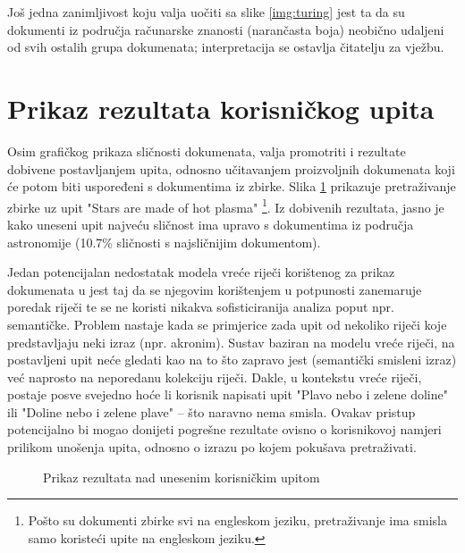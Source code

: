 \documentclass[times, utf8, zavrsni, numeric]{fer}
\begin{document}
Još jedna zanimljivost koju valja uočiti sa slike \ref{img:turing} jest ta da su dokumenti iz područja računarske znanosti (narančasta boja) neobično udaljeni od svih ostalih grupa dokumenata; interpretacija se ostavlja čitatelju za vježbu.

\section{Prikaz rezultata korisničkog upita}

Osim grafičkog prikaza sličnosti dokumenata, valja promotriti i rezultate dobivene postavljanjem upita, odnosno učitavanjem proizvoljnih dokumenata koji će potom biti uspoređeni s dokumentima iz zbirke. Slika \ref{img:astronomy_query} prikazuje pretraživanje zbirke uz upit "Stars are made of hot plasma" \footnote{Pošto su dokumenti zbirke svi na engleskom jeziku, pretraživanje ima smisla samo koristeći upite na engleskom jeziku.}. Iz dobivenih rezultata, jasno je kako uneseni upit najveću sličnost ima upravo s dokumentima iz područja astronomije (10.7\% sličnosti s najsličnijim dokumentom).

Jedan potencijalan nedostatak modela vreće riječi korištenog za prikaz dokumenata u jest taj da se njegovim korištenjem u potpunosti zanemaruje poredak riječi te se ne koristi nikakva sofisticiranija analiza poput npr. semantičke. Problem nastaje kada se primjerice zada upit od nekoliko riječi koje predstavljaju neki izraz (npr. akronim). Sustav baziran na modelu vreće riječi, na postavljeni upit neće gledati kao na to što zapravo jest (semantički smisleni izraz) već naprosto na neporedanu kolekciju riječi. Dakle, u kontekstu vreće riječi, postaje posve svejedno hoće li korisnik napisati upit "Plavo nebo i zelene doline" ili "Doline nebo i zelene plave" -- što naravno nema smisla. Ovakav pristup potencijalno bi mogao donijeti pogrešne rezultate ovisno o korisnikovoj namjeri prilikom unošenja upita, odnosno o izrazu po kojem pokušava pretraživati.

\begin{figure}
\caption{Prikaz rezultata nad unesenim korisničkim upitom}
\label{img:astronomy_query}
\end{figure}
\end{document}
